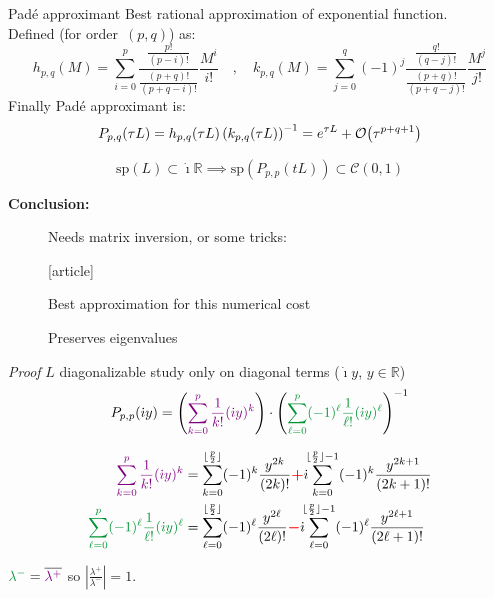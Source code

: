 \documentclass{beamer}
\newcommand{\cmark}{{\color{dgreen}\ding{52}}}
\newcommand{\xmark}{{\color{mred}\ding{55}}}
\newcommand{\arrow}{{\color{PLB}\ding{220}}}
\newcommand{\mbold}[1]{{\textbf{\color{PLB}#1}}}
\newcommand{\customcite}[1]{\cite{#1}}
\newcommand{\Mvb}[1]{\boldsymbol{#1}}
\newcommand{\I}{\dot{\imath}}
\begin{document}
\begin{frame}{Padé approximant}
  Best rational approximation of exponential function. \\
  Defined (for order~$(p,q)$) as:
  $$
      h_{p,q}(M) = \sum_{i=0}^p        \frac{\frac{p!}{(p-i)!}}{\frac{(p+q)!}{(p+q-i)!}} \frac{M^i}{i!} \quad,\quad
      k_{p,q}(M) = \sum_{j=0}^q (-1)^j \frac{\frac{q!}{(q-j)!}}{\frac{(p+q)!}{(p+q-j)!}} \frac{M^j}{j!}
  $$
  Finally Padé approximant is:
  $$
    P_{p,q}(\tau L) = h_{p,q}(\tau L)\left( k_{p,q}(\tau L) \right)^{-1} = e^{\tau L} + \order{\tau^{p+q+1}}
  $$
  \vspace{-0.5cm}
  \begin{theorem}
    $$\text{sp}(L)\subset\I\mathbb{R} \implies \text{sp}(P_{p,p}(tL))\subset\mathcal{C}(0,1)$$
  \end{theorem}

  \mbold{Conclusion:}
  \begin{description}
    \item[\xmark] Needs matrix inversion, or some tricks:
      \vspace{-0.1cm}
      \begin{thebibliography}{9}
        [article]
         \customcite{Li:2011}
      \end{thebibliography}
    \item[\cmark] Best approximation for this numerical cost
    \item[\cmark] Preserves eigenvalues
  \end{description}
\end{frame}
\begin{frame}{\emph{Proof}}
  $L$ diagonalizable \arrow{} study only on diagonal terms ($\I y$, $y\in\mathbb{R}$)
  $$
    P_{p,p}(\I y) = \left( \textcolor{violet}{\sum_{k=0}^p \frac{1}{k!}(\I y)^k} \right)\cdot\left(\textcolor{dgreen}{\sum_{\ell=0}^p (-1)^\ell\frac{1}{\ell!}(\I y)^\ell}\right)^{-1}
  $$

  $$
    \begin{aligned}
      \textcolor{violet}{\sum_{k=0}^p \frac{1}{k!}(\I y)^k}                   &= \sum_{k=0}^{\lfloor\frac{p}{2}\rfloor}    (-1)^k\frac{y^{2k}}{(2k)!}          \textcolor{red}{\Mvb{+}}\I\!\!\sum_{k=0}^{\lfloor\frac{p}{2}\rfloor-1} (-1)^k \frac{y^{2k+1}}{(2k+1)!} \\
      \textcolor{dgreen}{\sum_{\ell=0}^p (-1)^\ell\frac{1}{\ell!}(\I y)^\ell} &= \sum_{\ell=0}^{\lfloor\frac{p}{2}\rfloor} (-1)^\ell\frac{y^{2\ell}}{(2\ell)!} \textcolor{red}{\Mvb{-}}\I\!\!\sum_{\ell=0}^{\lfloor\frac{p}{2}\rfloor-1} (-1)^\ell \frac{y^{2\ell+1}}{(2\ell+1)!}
    \end{aligned}
  $$

  $\textcolor{dgreen}{\lambda^-} = \overline{\textcolor{violet}{\lambda^+}}$ so $\left|\frac{\lambda^+}{\lambda^-}\right|=1$.
\end{frame}
\end{document}

